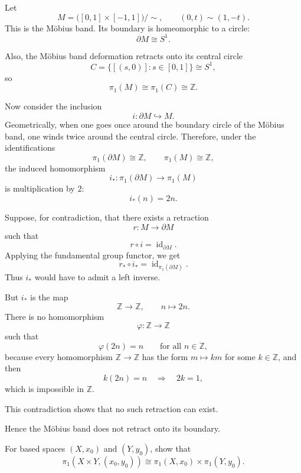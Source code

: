 \begin{solution}
Let
\[
M=\bigl([0,1]\times[-1,1]\bigr)/\sim,
\qquad
(0,t)\sim(1,-t).
\]
This is the Möbius band. Its boundary is homeomorphic to a circle:
\[
\partial M \cong S^1.
\]

Also, the Möbius band deformation retracts onto its central circle
\[
C=\{[(s,0)] : s\in[0,1]\}\cong S^1,
\]
so
\[
\pi_1(M)\cong \pi_1(C)\cong \mathbb Z.
\]

Now consider the inclusion
\[
i:\partial M\hookrightarrow M.
\]
Geometrically, when one goes once around the boundary circle of the Möbius band, one winds twice around the central circle. Therefore, under the identifications
\[
\pi_1(\partial M)\cong \mathbb Z,
\qquad
\pi_1(M)\cong \mathbb Z,
\]
the induced homomorphism
\[
i_*:\pi_1(\partial M)\to \pi_1(M)
\]
is multiplication by \(2\):
\[
i_*(n)=2n.
\]

Suppose, for contradiction, that there exists a retraction
\[
r:M\to \partial M
\]
such that
\[
r\circ i=\operatorname{id}_{\partial M}.
\]
Applying the fundamental group functor, we get
\[
r_*\circ i_*=\operatorname{id}_{\pi_1(\partial M)}.
\]
Thus \(i_*\) would have to admit a left inverse.

But \(i_*\) is the map
\[
\mathbb Z \to \mathbb Z,
\qquad
n\mapsto 2n.
\]
There is no homomorphism
\[
\varphi:\mathbb Z\to\mathbb Z
\]
such that
\[
\varphi(2n)=n
\qquad\text{for all }n\in\mathbb Z,
\]
because every homomorphism \(\mathbb Z\to\mathbb Z\) has the form \(m\mapsto km\) for some \(k\in\mathbb Z\), and then
\[
k(2n)=n
\quad\Longrightarrow\quad
2k=1,
\]
which is impossible in \(\mathbb Z\).

This contradiction shows that no such retraction can exist.

Hence the Möbius band does not retract onto its boundary.
\end{solution}

\begin{problem}
For based spaces \((X,x_0)\) and \((Y,y_0)\), show that
\[
\pi_1(X\times Y,(x_0,y_0))
\cong
\pi_1(X,x_0)\times \pi_1(Y,y_0).
\]
\end{problem}

